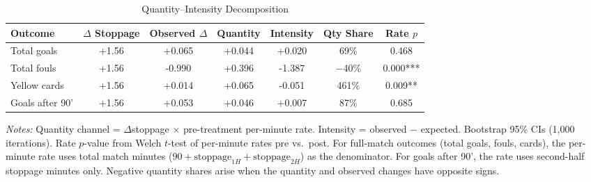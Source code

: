 \begin{table}[htbp]
\centering
\caption{Quantity--Intensity Decomposition}
\label{tab:decomposition}
\begin{threeparttable}
\begin{tabular}{lcccccc}
\toprule
Outcome & $\Delta$ Stoppage & Observed $\Delta$ & Quantity & Intensity & Qty Share & Rate $p$ \\
\midrule
  Total goals & +1.56 & +0.065 & +0.044 & +0.020 & 69\% & 0.468 \\
  Total fouls & +1.56 & -0.990 & +0.396 & -1.387 & $-$40\% & 0.000*** \\
  Yellow cards & +1.56 & +0.014 & +0.065 & -0.051 & 461\% & 0.009** \\
  Goals after 90' & +1.56 & +0.053 & +0.046 & +0.007 & 87\% & 0.685 \\
\bottomrule
\end{tabular}
\begin{tablenotes}[flushleft]\footnotesize
\item \textit{Notes:} Quantity channel = $\Delta$stoppage $\times$ pre-treatment per-minute rate. Intensity = observed $-$ expected. Bootstrap 95\% CIs (1,000 iterations). Rate $p$-value from Welch $t$-test of per-minute rates pre vs.\ post. For full-match outcomes (total goals, fouls, cards), the per-minute rate uses total match minutes ($90 + \text{stoppage}_{1H} + \text{stoppage}_{2H}$) as the denominator. For goals after 90', the rate uses second-half stoppage minutes only. Negative quantity shares arise when the quantity and observed changes have opposite signs.
\end{tablenotes}
\end{threeparttable}
\end{table}

